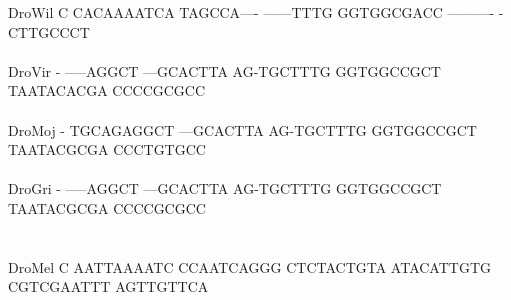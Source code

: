 \documentclass[11pt,twoside,reqno,a4paper]{article}
\begin{document}
{DroWil	C	CACAAAATCA	TAGCCA----	------TTTG	GGTGGCGACC	----------	-CTTGCCCT\\
\hspace*{7\charwidth}\hspace*{1\charwidth}\hspace*{1\charwidth}\hspace*{1\charwidth}\hspace*{1\charwidth}\hspace*{1\charwidth}\hspace*{1\charwidth}\\
DroVir	-	-----AGGCT	---GCACTTA	AG-TGCTTTG	GGTGGCCGCT	TAATACACGA	CCCCGCGCC\\
\hspace*{7\charwidth}\hspace*{1\charwidth}\hspace*{1\charwidth}\hspace*{1\charwidth}\hspace*{1\charwidth}\hspace*{1\charwidth}\hspace*{1\charwidth}\\
DroMoj	-	TGCAGAGGCT	---GCACTTA	AG-TGCTTTG	GGTGGCCGCT	TAATACGCGA	CCCTGTGCC\\
\hspace*{7\charwidth}\hspace*{1\charwidth}\hspace*{1\charwidth}\hspace*{1\charwidth}\hspace*{1\charwidth}\hspace*{1\charwidth}\hspace*{1\charwidth}\\
DroGri	-	-----AGGCT	---GCACTTA	AG-TGCTTTG	GGTGGCCGCT	TAATACGCGA	CCCCGCGCC\\
\hspace*{7\charwidth}\hspace*{1\charwidth}\hspace*{1\charwidth}\hspace*{1\charwidth}\hspace*{1\charwidth}\hspace*{1\charwidth}\hspace*{1\charwidth}\\
\\
DroMel	C	AATTAAAATC	CCAATCAGGG	CTCTACTGTA	ATACATTGTG	CGTCGAATTT	AGTTGTTCA\\
\hspace*{7\charwidth}\hspace*{1\charwidth}\hspace*{1\charwidth}\hspace*{1\charwidth}\hspace*{1\charwidth}\hspace*{1\charwidth}\hspace*{1\charwidth}\\
}
\end{document}
